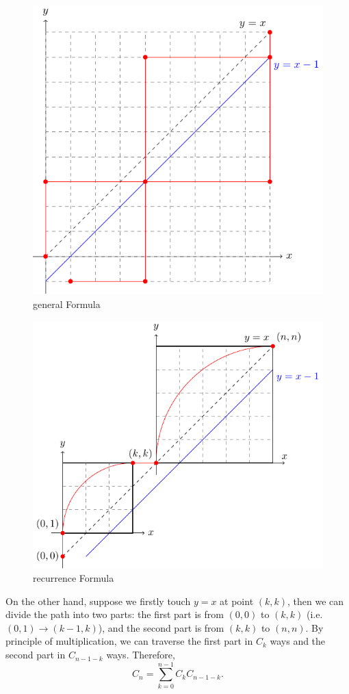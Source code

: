 \begin{multicols}{2}
    \begin{figure}[H]
        \centering
        \includegraphics[width=0.9\columnwidth]{figures/symmetry.pdf}
        \caption{general Formula}\label{fig:symmetry}
    \end{figure}
    \begin{figure}[H]
        \centering
        \includegraphics[width=\columnwidth]{figures/recurrence.pdf}
        \caption{recurrence Formula}\label{fig:recurrence}
    \end{figure}
\end{multicols}

On the other hand, suppose we firstly touch $y=x$ at point $(k,k)$, then we can divide the path into two parts: the first part is from $(0,0)$ to $(k,k)$ (i.e. $(0,1)\to(k-1,k)$), and the second part is from $(k,k)$ to $(n,n)$. By principle of multiplication, we can traverse the first part in $C_k$ ways and the second part in $C_{n-1-k}$ ways. Therefore,
\[
    C_n = \sum_{k=0}^{n-1} C_kC_{n-1-k}.
\]